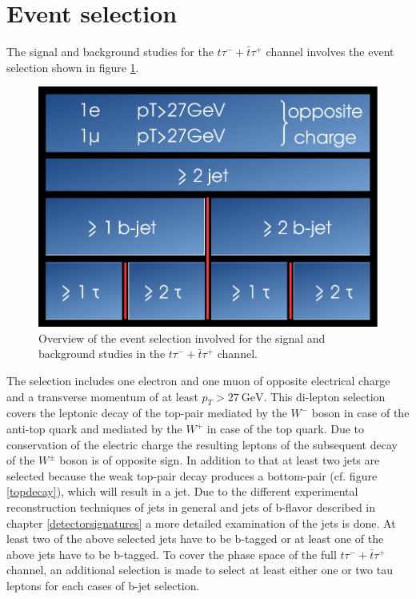\section{Event selection}\label{eventselection}
The signal and background studies for the $t\tau^{-}+\bar{t}\tau^{+}$ channel involves the event selection shown in figure \ref{selection}.\newline
%
\begin{figure}[htbp]                                 
 \begin{center}                                       
  \includegraphics[width=0.45\linewidth]{figures/selection.pdf} 
   \caption[Overview of the event selection.]{Overview of the event selection involved for the signal and background studies in the $t\tau^{-}+\bar{t}\tau^{+}$ channel.}
  \label{selection}                                    
 \end{center}
\end{figure}
%
The selection includes one electron and one muon of opposite electrical charge and a transverse momentum of at least $p_T>\SI{27}{\giga\electronvolt}$. This di-lepton selection covers the leptonic decay of the top-pair mediated by the $W^-$ boson in case of the anti-top quark and mediated by the $W^+$ in case of the top quark. Due to conservation of the electric charge the resulting leptons of the subsequent decay of the $W^\pm$ boson is of opposite sign. In addition to that at least two jets are selected because the weak top-pair decay produces a bottom-pair (cf. figure \ref{topdecay}), which will result in a jet. Due to the different experimental reconstruction techniques of jets in general and jets of b-flavor described in chapter \ref{detectorsignatures} a more detailed examination of the jets is done. At least two of the above selected jets have to be b-tagged or at least one of the above jets have to be b-tagged. To cover the phase space of the full $t\tau^{-}+\bar{t}\tau^{+}$ channel, an additional selection is made to select at least either one or two tau leptons for each cases of b-jet selection.    
